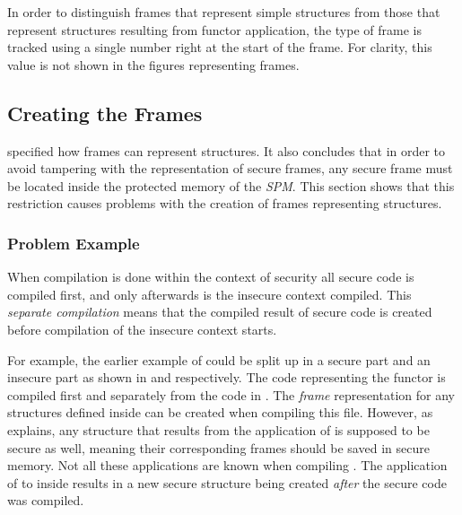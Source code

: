 \documentclass[10pt,a4paper,master=cws, masteroption=ai,english,inputenc=utf8]{kulemt}
\begin{document}
In order to distinguish frames that represent simple structures from those that represent structures resulting from functor application, the type of frame is tracked using a single number right at the start of the frame.
For clarity, this value is not shown in the figures representing frames.

\subsection{Creating the Frames}
 specified how frames can represent structures.
It also concludes that in order to avoid tampering with the representation of secure frames, any secure frame must be located inside the protected memory of the \emph{SPM}.
This section shows that this restriction causes problems with the creation of frames representing structures.

\subsubsection{Problem Example}
When compilation is done within the context of security all secure code is compiled first, and only afterwards is the insecure context compiled.
This \emph{separate compilation} means that the compiled result of secure code is created before compilation of the insecure context starts.

For example, the earlier example of  could be split up in a secure part and an insecure part as shown in  and  respectively.
The code representing the functor is compiled first and separately from the code in . 
The \emph{frame} representation for any structures defined inside  can be created when compiling this file.
However, as  explains, any structure that results from the application of  is supposed to be secure as well, meaning their corresponding frames should be saved in secure memory. 
Not all these applications are known when compiling .
The application of  to  inside  results in a new secure structure being created \emph{after} the secure code was compiled.
\end{document}
